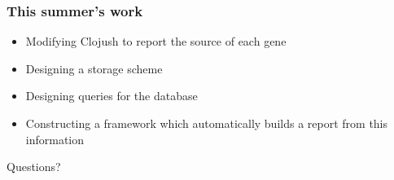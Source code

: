 \documentclass{beamer}
\begin{document}
\begin{frame}
  \frametitle{This summer's work}
  \begin{itemize}
  \item Modifying Clojush to report the source of each gene
  \item Designing a storage scheme
  \item Designing queries for the database
  \item Constructing a framework which automatically builds a report from this information
  \end{itemize}
\end{frame}

\begin{frame}
  Questions?
\end{frame}

\appendix
\end{document}
